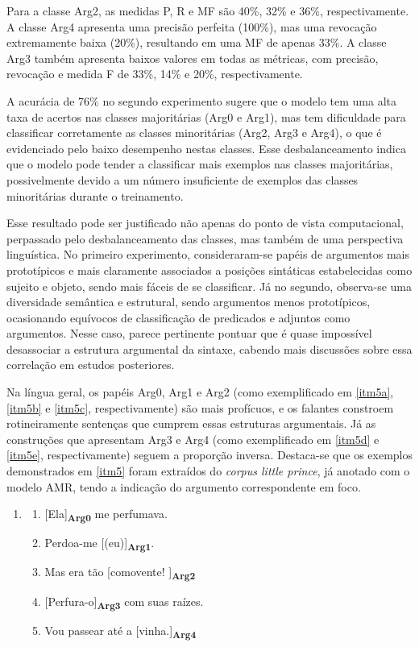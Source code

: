 Para a classe Arg2, as medidas P, R e MF são 40\%, 32\% e 36\%,
respectivamente. A classe Arg4 apresenta uma precisão perfeita (100\%),
mas uma revocação extremamente baixa (20\%), resultando em uma MF de
apenas 33\%. A classe Arg3 também apresenta baixos valores em todas as
métricas, com precisão, revocação e medida F de 33\%, 14\% e 20\%,
respectivamente.

A acurácia de 76\% no segundo experimento sugere que o modelo tem uma
alta taxa de acertos nas classes majoritárias (Arg0 e Arg1), mas tem
dificuldade para classificar corretamente as classes minoritárias (Arg2,
Arg3 e Arg4), o que é evidenciado pelo baixo desempenho nestas classes.
Esse desbalanceamento indica que o modelo pode tender a classificar mais
exemplos nas classes majoritárias, possivelmente devido a um número
insuficiente de exemplos das classes minoritárias durante o treinamento.

Esse resultado pode ser justificado não apenas do ponto de vista
computacional, perpassado pelo desbalanceamento das classes, mas também
de uma perspectiva linguística. No primeiro experimento, consideraram-se
papéis de argumentos mais prototípicos e mais claramente associados a
posições sintáticas estabelecidas como sujeito e objeto, sendo mais
fáceis de se classificar. Já no segundo, observa-se uma diversidade
semântica e estrutural, sendo argumentos menos prototípicos, ocasionando
equívocos de classificação de predicados e adjuntos como argumentos.
Nesse caso, parece pertinente pontuar que é quase impossível desassociar
a estrutura argumental da sintaxe, cabendo mais discussões sobre essa
correlação em estudos posteriores.

Na língua geral, os papéis Arg0, Arg1 e Arg2 (como exemplificado em \ref{itm5a}, \ref{itm5b} e \ref{itm5c}, respectivamente) são mais profícuos, e os falantes constroem
rotineiramente sentenças que cumprem essas estruturas argumentais. Já as
construções que apresentam Arg3 e Arg4 (como exemplificado em \ref{itm5d} e \ref{itm5e},
respectivamente) seguem a proporção inversa. Destaca-se que os exemplos
demonstrados em \ref{itm5} foram extraídos do \emph{corpus little prince}, já
anotado com o modelo AMR, tendo a indicação do argumento correspondente
em foco.


\begin{enumerate}[start=5,label={(\arabic{enumi})}]
  \item\label{itm5}
    \begin{enumerate}[label=(\arabic{enumi}.\alph*)]
      \item\label{itm5a} {[}Ela{]}\textbf{\textsubscript{Arg0}} me perfumava.
      \item\label{itm5b} Perdoa-me {[}(eu){]}\textbf{\textsubscript{Arg1}}.
      \item\label{itm5c} Mas era tão {[}comovente!{ ]}\textbf{\textsubscript{Arg2}}
      \item\label{itm5d} {[}Perfura-o{]}\textbf{\textsubscript{Arg3}} com suas raízes.
      \item\label{itm5e} Vou passear até a {[}vinha.{]}\textbf{\textsubscript{Arg4}}
    \end{enumerate}
\end{enumerate}

